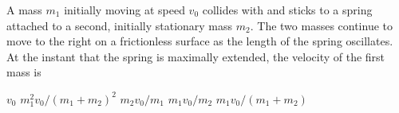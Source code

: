 \documentclass{../../../oss-apphys-exam}
\begin{document}
\begin{multicols*}{2}
\begin{questions}
    
    \question A mass $m_1$ initially moving at speed $v_0$ collides with and
    sticks to a spring attached to a second, initially stationary mass $m_2$.
    The two masses continue to move to the right on a frictionless surface as
    the length of the spring oscillates. At the instant that the spring is
    maximally extended, the velocity of the first mass is
    \begin{center}
    \end{center}
    \begin{choices}
      \choice $v_0$
      \choice $m_1^2v_0/(m_1+m_2)^2$
      \choice $m_2v_0/m_1$
      \choice $m_1v_0/m_2$
      \choice $m_1v_0/(m_1+m_2)$
    \end{choices}
  \end{questions}
\end{multicols*}
\newpage
\end{document}
